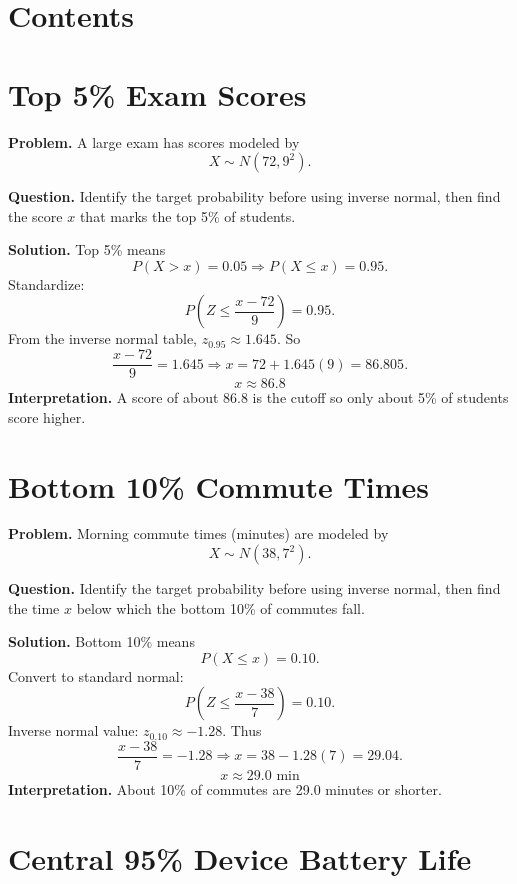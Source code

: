 




\section*{Contents}
\tableofcontents
\section{Top 5\% Exam Scores}

\textbf{Problem.}
A large exam has scores modeled by
\[
X \sim N(72, 9^2).
\]

\textbf{Question.} Identify the target probability before using inverse normal, then find the score \(x\) that marks the top 5\% of students.

\textbf{Solution.}
Top 5\% means
\[
P(X>x)=0.05 \Rightarrow P(X\le x)=0.95.
\]
Standardize:
\[
P\!\left(Z\le \frac{x-72}{9}\right)=0.95.
\]
From the inverse normal table, \(z_{0.95}\approx 1.645\).
So
\[
\frac{x-72}{9}=1.645 \Rightarrow x=72+1.645(9)=86.805.
\]
\[
\boxed{x\approx 86.8}
\]
\textbf{Interpretation.} A score of about 86.8 is the cutoff so only about 5\% of students score higher.

\section{Bottom 10\% Commute Times}

\textbf{Problem.}
Morning commute times (minutes) are modeled by
\[
X \sim N(38, 7^2).
\]

\textbf{Question.} Identify the target probability before using inverse normal, then find the time \(x\) below which the bottom 10\% of commutes fall.

\textbf{Solution.}
Bottom 10\% means
\[
P(X\le x)=0.10.
\]
Convert to standard normal:
\[
P\!\left(Z\le \frac{x-38}{7}\right)=0.10.
\]
Inverse normal value: \(z_{0.10}\approx -1.28\).
Thus
\[
\frac{x-38}{7}=-1.28 \Rightarrow x=38-1.28(7)=29.04.
\]
\[
\boxed{x\approx 29.0\text{ min}}
\]
\textbf{Interpretation.} About 10\% of commutes are 29.0 minutes or shorter.

\section{Central 95\% Device Battery Life}

